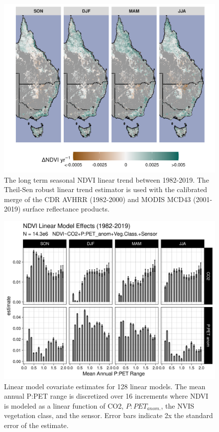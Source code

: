 \documentclass[gc, manuscript]{copernicus}
\begin{document}
\clearpage
\begin{figure}
\includegraphics[width=14cm]{../../figures/appendix-A/SM_Fig3_ndvi_f_of_timeANDsensor_seasonal_longterm_ThielSen_Trend_1982_2019_2021-02-28} \caption{The long term seasonal NDVI linear trend between 1982-2019. The Theil-Sen robust linear trend estimator is used with the calibrated merge of the CDR AVHRR (1982-2000) and MODIS MCD43 (2001-2019) surface reflectance products.}\label{fig:FigA3}
\end{figure}
\clearpage

\clearpage
\begin{figure}
\includegraphics[width=14cm]{../../figures/appendix-A/SM_Fig4_big_linearModel_by_MAPPET_range} \caption{Linear model covariate estimates for 128 linear models. The mean annual P:PET range is discretized over 16 increments where NDVI is modeled as a linear function of CO2, $P:PET_{anom.}$, the NVIS vegetation class, and the sensor. Error bars indicate 2x the standard error of the estimate.}\label{fig:FigA4}
\end{figure}
\clearpage
\end{document}
